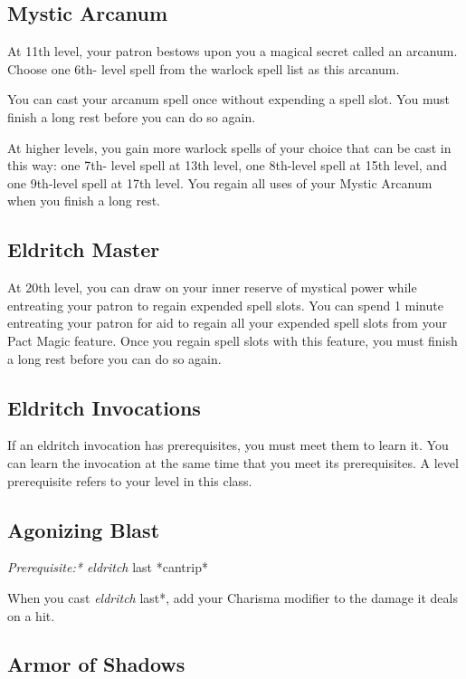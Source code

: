 \subsection{Mystic Arcanum}

At 11th level, your patron bestows upon you a magical secret called an arcanum. Choose one 6th- level spell from the warlock spell list as this arcanum.

You can cast your arcanum spell once without expending a spell slot. You must finish a long rest before you can do so again.

At higher levels, you gain more warlock spells of your choice that can be cast in this way: one 7th- level spell at 13th level, one 8th-level spell at 15th level, and one 9th-level spell at 17th level. You regain all uses of your Mystic Arcanum when you finish a long rest.

\subsection{Eldritch Master}

At 20th level, you can draw on your inner reserve of mystical power while entreating your patron to regain expended spell slots. You can spend 1 minute entreating your patron for aid to regain all your expended spell slots from your Pact Magic feature. Once you regain spell slots with this feature, you must finish a long rest before you can do so again.

\subsection{Eldritch Invocations}

If an eldritch invocation has prerequisites, you must meet them to learn it. You can learn the invocation at the same time that you meet its prerequisites. A level prerequisite refers to your level in this class.

\subsection{Agonizing Blast}

\textit{Prerequisite:* eldritch }last *cantrip*

When you cast \textit{eldritch }last*, add your Charisma modifier to the damage it deals on a hit.

\subsection{Armor of Shadows}

